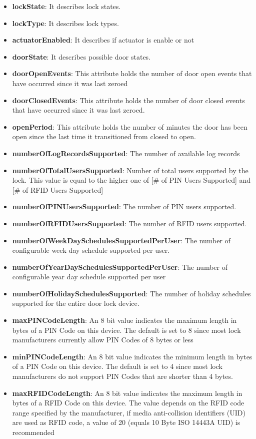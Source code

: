 \begin{itemize}
\item \textbf{lockState}: It describes lock states.
\item \textbf{lockType}: It describes lock types.
\item \textbf{actuatorEnabled}: It describes if actuator is enable or not
\item \textbf{doorState}: It describes possible door states.
\item \textbf{doorOpenEvents}: This attribute holds the number of door open events that have occurred since it was last zeroed
\item \textbf{doorClosedEvents}: This attribute holds the number of door closed events that have occurred since it was last zeroed.
\item \textbf{openPeriod}: This attribute holds the number of minutes the door has been open since the last time it transitioned from closed to open.
\item \textbf{numberOfLogRecordsSupported}: The number of available log records
\item \textbf{numberOfTotalUsersSupported}: Number of total users supported by the lock. This value is equal to the higher one of [\# of PIN Users Supported] and [\# of RFID Users Supported]
\item \textbf{numberOfPINUsersSupported}: The number of PIN users supported.
\item \textbf{numberOfRFIDUsersSupported}: The number of RFID users supported.
\item \textbf{numberOfWeekDaySchedulesSupportedPerUser}: The number of configurable week day schedule supported per user.
\item \textbf{numberOfYearDaySchedulesSupportedPerUser}: The number of configurable year day schedule supported per user
\item \textbf{numberOfHolidaySchedulesSupported}: The number of holiday schedules supported for the entire door lock device.
\item \textbf{maxPINCodeLength}: An 8 bit value indicates the maximum length in bytes of a PIN Code on this device. The default is set to 8 since most lock manufacturers currently allow PIN Codes of 8 bytes or less
\item \textbf{minPINCodeLength}: An 8 bit value indicates the minimum length in bytes of a PIN Code on this device. The default is set to 4 since most lock manufacturers do not support PIN Codes that are shorter than 4 bytes.
\item \textbf{maxRFIDCodeLength}: An 8 bit value indicates the maximum length in bytes of a RFID Code on this device. The value depends on the RFID code range specified by the manufacturer, if media anti-collision identifiers (UID) are used as RFID code, a value of 20 (equals 10 Byte ISO 14443A UID) is recommended

\end{itemize}
